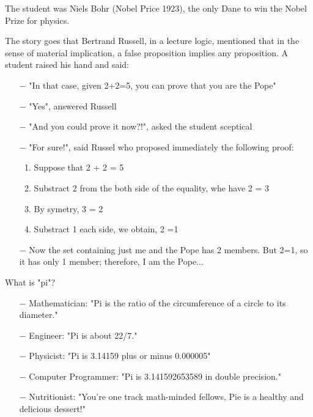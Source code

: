 The student was Niels Bohr (Nobel Price 1923), the only Dane to win the Nobel Prize for physics. 
\begin{center}\underline{\hspace{5 cm}}\end{center}
	
The story goes that Bertrand Russell, in a lecture logic, mentioned that in the sense of material implication, a false proposition implies any proposition. A student raised his hand and said:

\begin{itemize}	 
	\item[$-$] "In that case, given 2+2=5, you can prove that you are the Pope"

	\item[$-$] "Yes", answered Russell

	\item[$-$] "And you could prove it now?!", asked the student sceptical

	\item[$-$] "For sure!", said Russel who proposed immediately the following proof:

	\begin{enumerate}
		\item Suppose that 2 + 2 = 5

		\item Substract 2 from the both side of the equality, whe have 2 = 3

		\item By symetry, 3 = 2

		\item Substract 1 each side, we obtain, 2 =1
	\end{enumerate}

	\item[$-$] Now the set containing just me and the Pope has 2 members. But 2=1, so it has only 1 member; therefore, I am the Pope...
\end{itemize}
	\begin{center}\underline{\hspace{5 cm}}\end{center}
	
What is "pi"?

\begin{itemize}	 
	\item[$-$] Mathematician: "Pi is the ratio of the circumference of a circle to its diameter."

	\item[$-$] Engineer: "Pi is about 22/7."

	\item[$-$] Physicist: "Pi is 3.14159 plus or minus 0.000005"

	\item[$-$] Computer Programmer: "Pi is 3.141592653589 in double precision."

	\item[$-$] Nutritionist: "You're one track math-minded fellows, Pie is a healthy and delicious dessert!"
\end{itemize}
	\begin{center}\underline{\hspace{5 cm}}\end{center}
	
